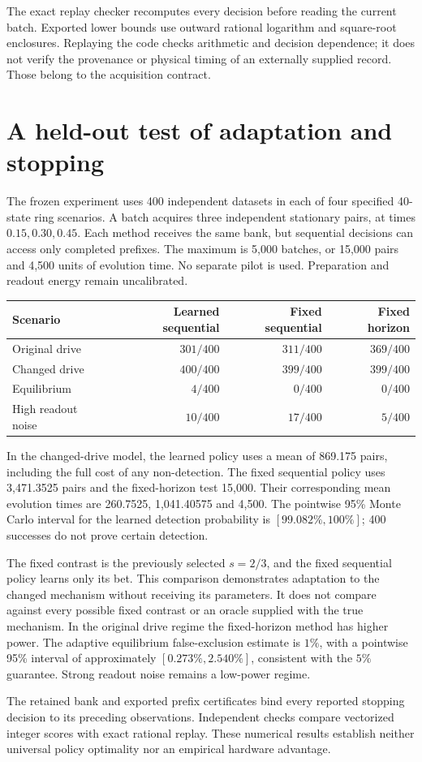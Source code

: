 The exact replay checker recomputes every decision before reading the current
batch. Exported lower bounds use outward rational logarithm and square-root
enclosures. Replaying the code checks arithmetic and decision dependence; it
does not verify the provenance or physical timing of an externally supplied
record. Those belong to the acquisition contract.

\section{A held-out test of adaptation and stopping}
The frozen experiment uses 400 independent datasets in each of four specified
40-state ring scenarios. A batch acquires three independent stationary pairs,
at times $0.15,0.30,0.45$. Each method receives the same bank, but sequential
decisions can access only completed prefixes. The maximum is 5,000 batches,
or 15,000 pairs and 4,500 units of evolution time. No separate pilot is used.
Preparation and readout energy remain uncalibrated.

\begin{center}\small
\begin{tabular}{lrrr}
\toprule
Scenario & Learned sequential & Fixed sequential & Fixed horizon\\
\midrule
Original drive & $301/400$ & $311/400$ & $369/400$\\
Changed drive & $400/400$ & $399/400$ & $399/400$\\
Equilibrium & $4/400$ & $0/400$ & $0/400$\\
High readout noise & $10/400$ & $17/400$ & $5/400$\\
\bottomrule
\end{tabular}\end{center}

In the changed-drive model, the learned policy uses a mean of 869.175 pairs,
including the full cost of any non-detection. The fixed sequential policy uses
3,471.3525 pairs and the fixed-horizon test 15,000. Their corresponding mean
evolution times are 260.7525, 1,041.40575 and 4,500. The pointwise 95\%
Monte Carlo interval for the learned detection probability is
$[99.082\%,100\%]$; 400 successes do not prove certain detection.

The fixed contrast is the previously selected $s=2/3$, and the fixed sequential
policy learns only its bet. This comparison demonstrates adaptation to the
changed mechanism without receiving its parameters. It does not compare
against every possible fixed contrast or an oracle supplied with the true
mechanism. In the original drive regime the fixed-horizon method has higher
power. The adaptive equilibrium false-exclusion estimate is $1\%$, with a
pointwise 95\% interval of approximately $[0.273\%,2.540\%]$, consistent with
the $5\%$ guarantee. Strong readout noise remains a low-power regime.

The retained bank and exported prefix certificates bind every reported stopping
decision to its preceding observations. Independent checks compare vectorized
integer scores with exact rational replay. These numerical results establish
neither universal policy optimality nor an empirical hardware advantage.
